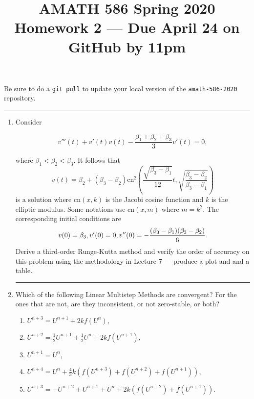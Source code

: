 \documentclass[10pt]{amsart}
\newcommand{\half}{\frac{1}{2}}
\newcommand\unp{U^{n+1}}
\begin{document}
\pagestyle{empty}

\newcommand{\mline}{\vspace{.2in}\hrule\vspace{.2in}}


\title{\bf { AMATH 586 Spring 2020 \\ Homework 2 ---
Due April 24 on GitHub by 11pm} }
\maketitle
\centerline{Be sure to do a {\tt git pull} to update your local version of the {\tt amath-586-2020} repository.}

\mline
\begin{enumerate}[label={\bf Problem~{\arabic*}:}]
  \item Consider

$$ v'''(t) + v'(t) v(t) - \frac{\beta_1 + \beta_2 + \beta_3}{3} v'(t) =0, $$

where $\beta_1 < \beta_2 < \beta_3$.  It follows that
$$
v(t) = \beta_2 + (\beta_3 - \beta_2) \mathrm{cn}^2\left( \frac{\sqrt{ \beta_3 - \beta_1}}{12} t, \sqrt{\frac{\beta_3 - \beta_2}{\beta_3 - \beta_1}} \right)
$$
is a solution where $\mathrm{cn}(x,k)$ is the Jacobi cosine function and $k$ is the elliptic modulus.  Some notations use $\mathrm{cn}(x,m)$ where $m = k^2$.  The corresponding initial conditions are
$$
v(0) = \beta_3, \\
v'(0) = 0,\\
v''(0) = -\frac{(\beta_3 - \beta_1)(\beta_3-\beta_2)}{6}.$$
Derive a third-order Runge-Kutta method and verify the order of accuracy on this problem using the methodology in Lecture 7 --- produce a plot and and a table.
\mline
\item  Which of the following Linear Multistep Methods are convergent?  For 
the ones that are not, are they inconsistent, or not zero-stable, or both?
 \begin{enumerate}
 \item $U^{n+3} = U^{n+1} + 2kf(U^n)$,
 \item $U^{n+2} = \half U^{n+1} + \half U^{n} + 2kf(U^{n+1})$,
 \item $\unp = U^n$, 
 \item $U^{n+4} = U^{n} + \frac 4 3 k(f(U^{n+3})+f(U^{n+2})+f(U^{n+1}))$,
 \item $U^{n+3} = -U^{n+2} + U^{n+1} +U^{n}+2k(f(U^{n+2})+f(U^{n+1}))$.
 \end{enumerate}


\end{enumerate}
\end{document}
